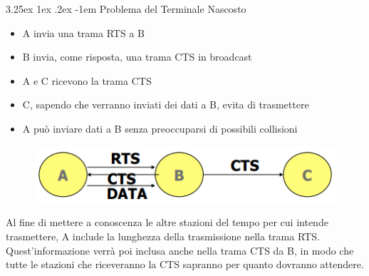 \documentclass{article}
\makeatletter
\renewcommand\paragraph{\@startsection{paragraph}{5}{\z@}%
  {3.25ex \@plus1ex \@minus.2ex}%
  {-1em}%
  {\normalfont\normalsize\bfseries}}
\makeatother
\begin{document}
                    \paragraph{Problema del Terminale Nascosto}
                        \begin{itemize}
                            \item A invia una trama RTS a B
                            \item B invia, come risposta, una trama CTS in broadcast
                            \item A e C ricevono la trama CTS
                            \item C, sapendo che verranno inviati dei dati a B, evita di trasmettere
                            \item A può inviare dati a B senza preoccuparsi di possibili collisioni 
                        \end{itemize}
                        \begin{figure}[H]
                            \centering
                            \includegraphics[width=\textwidth]{pic/nascosto_cts_rts.png}
                            \label{Soluzione al Terminale Nascosto con RTS/CTS}
                        \end{figure}
                        Al fine di mettere a conoscenza le altre stazioni del tempo per cui intende trasmettere, A include la lunghezza della trasmissione nella trama RTS. Quest'informazione verrà poi inclusa anche nella trama CTS da B, in modo che tutte le stazioni che riceveranno la CTS sapranno per quanto dovranno attendere. 
\end{document}
